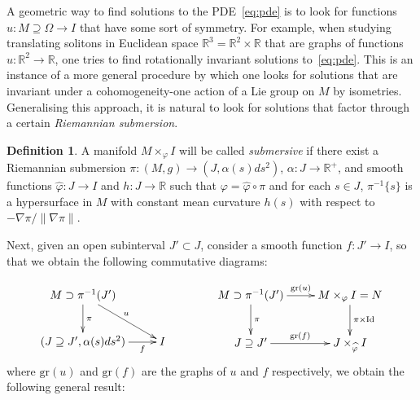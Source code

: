 \documentclass[oneside,12pt]{amsart}
\theoremstyle{definition}
\newtheorem{definition}[lemma]{Definition}
\newcommand{\R}{\mathbb{R}}
\begin{document}
A geometric way to find solutions to the PDE~\eqref{eq:pde} is to look for functions $u \colon M \supseteq \Omega \to I$ that have some sort of symmetry. For example, when studying translating solitons in Euclidean space $\R^3 = \R^2 \times \R$ that are graphs of functions $u \colon \R^2 \to \R$, one tries to find rotationally invariant solutions to~\eqref{eq:pde}. This is an instance of a more general procedure by which one looks for solutions that are invariant under a cohomogeneity-one action of a Lie group on $M$ by isometries. Generalising this approach, it is natural to look for solutions that factor through a certain \emph{Riemannian submersion}. 

\begin{definition}A manifold $M\times_{\varphi} I$ will be called \emph{submersive} if there exist a Riemannian submersion $\pi:(M,g)\to (J,\alpha(s)ds^2)$, $\alpha:J\to\R^+$, and smooth functions $\hat{\varphi}:J\to I$ and $h:J\to\R$ such that $\varphi=\hat{\varphi}\circ\pi$ and for each $s\in J$, $\pi^{-1}\{s\}$ is a hypersurface in $M$ with constant mean curvature $h(s)$ with respect to $-\nabla\pi/\|\nabla\pi\|$.   
\end{definition} 
Next, given an open subinterval $J'\subset J$, consider a smooth function $f:J'\to I$,  so that we obtain the following commutative diagrams:

\begin{equation*}\label{diagrams}
    \xymatrix{ M \supset \pi^{-1}(J')  \ar[d]^{\pi} \ar[dr]^{u} \\ (J \supseteq J' , \alpha(s) ds^2) \ar[r]_-{f} & I } \qquad \qquad
    \xymatrix{M \supset \pi^{-1}(J')  \ar[r]^-{\mathrm{gr}(u)}  \ar[d]^{\pi}   &
    M\times_{\varphi} I = N \ar[d]^{\pi\times \mathrm{Id}} \\
    J \supseteq J' \ar[r]^-{\mathrm{gr}(f)}  & J \times_{\widehat{\varphi}} I }
    \end{equation*}
where $\mathrm{gr}(u)$ and $\mathrm{gr}(f)$ are the graphs of $u$ and $f$ respectively, we obtain the following general result:
\end{document}
